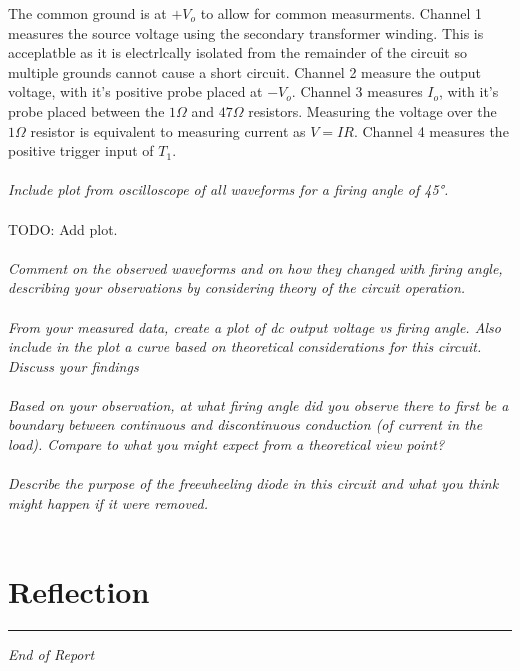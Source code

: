 \documentclass[12pt,a4paper]{article}
\begin{document}
The common ground is at $+V_o$ to allow for common measurments. Channel 1 measures the source voltage using the secondary transformer winding. This is acceplatble as it is electrlcally isolated from the remainder of the circuit so multiple grounds cannot cause a short circuit. Channel 2 measure the output voltage, with it's positive probe placed at $-V_o$. Channel 3 measures $I_o$, with it's probe placed between the $1\Omega$ and $47\Omega$ resistors. Measuring the voltage over the $1\Omega$ resistor is equivalent to measuring current as $V=IR$. Channel 4 measures the positive trigger input of $T_1$. \\\\ 

\textit{Include plot from oscilloscope of all waveforms for a firing angle of 45°.}\\\\

TODO: Add plot.\\\\

\textit{Comment on the observed waveforms and on how they changed with firing angle, describing your observations by considering theory of the circuit operation.}\\\\


\textit{From your measured data, create a plot of dc output voltage vs firing angle. Also include in the plot a curve based on theoretical considerations for this circuit. Discuss your findings}\\\\

\textit{Based on your observation, at what firing angle did you observe there to first be a boundary between continuous and discontinuous conduction (of current in the load). Compare to what you might expect from a theoretical view point?}\\\\

\textit{Describe the purpose of the freewheeling diode in this circuit and what you think might happen if it were removed.}\\\\

\section{Reflection}


\vfill
\hrule
\begin{center}
\textit{End of Report}
\end{center}
\end{document}
